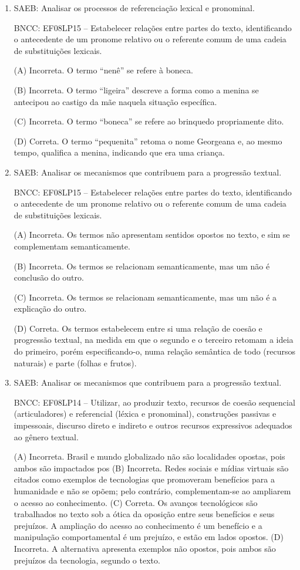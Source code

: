 \begin{enumerate}
\item
SAEB: Analisar os processos de referenciação lexical e pronominal. 

BNCC: EF08LP15 -- Estabelecer relações entre partes do texto, identificando o
antecedente de um pronome relativo ou o referente comum de uma cadeia de
substituições lexicais.

(A) Incorreta. O termo ``nenê'' se refere à boneca.

(B) Incorreta. O termo ``ligeira'' descreve a forma como a menina se
antecipou ao castigo da mãe naquela situação específica.

(C) Incorreta. O termo ``boneca'' se refere ao brinquedo propriamente
dito.

(D) Correta. O termo ``pequenita'' retoma o nome Georgeana e, ao mesmo
tempo, qualifica a menina, indicando que era uma criança.

\item

SAEB: Analisar os mecanismos que contribuem para a progressão textual.

BNCC: EF08LP15 -- Estabelecer relações entre partes do texto,
identificando o antecedente de um pronome relativo ou o referente comum
de uma cadeia de substituições lexicais.

(A) Incorreta. Os termos não apresentam sentidos opostos no texto, e sim
se complementam semanticamente.

(B) Incorreta. Os termos se relacionam semanticamente, mas um não é
conclusão do outro.

(C) Incorreta. Os termos se relacionam semanticamente, mas um não é a
explicação do outro.

(D) Correta. Os termos estabelecem entre si uma relação de coesão e
progressão textual, na medida em que o segundo e o terceiro retomam a
ideia do primeiro, porém especificando-o, numa relação semântica de todo
(recursos naturais) e parte (folhas e frutos).

\item

SAEB: Analisar os mecanismos que contribuem para a progressão textual.

BNCC: EF08LP14 -- Utilizar, ao produzir texto, recursos de coesão
sequencial (articuladores) e referencial (léxica e pronominal),
construções passivas e impessoais, discurso direto e indireto e outros
recursos expressivos adequados ao gênero textual.

(A) Incorreta. Brasil e mundo globalizado não são localidades opostas,
pois ambos são impactados pos
(B) Incorreta. Redes sociais e mídias
virtuais são citados como exemplos de tecnologias que promoveram
benefícios para a humanidade e não se opõem; pelo contrário,
complementam-se ao ampliarem o acesso ao conhecimento. 
(C) Correta. Os
avanços tecnológicos são trabalhados no texto sob a ótica da oposição
entre seus benefícios e seus prejuízos. A ampliação do acesso ao
conhecimento é um benefício e a manipulação comportamental é um
prejuízo, e estão em lados opostos. 
(D) Incorreta. A alternativa
apresenta exemplos não opostos, pois ambos são prejuízos da tecnologia,
segundo o texto.


\end{enumerate}
